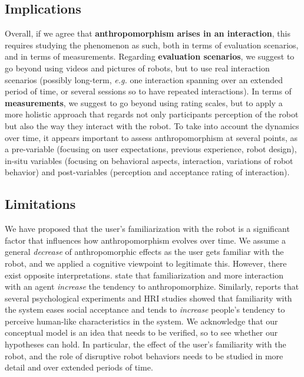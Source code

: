 \documentclass{frontiersSCNS} %
\newcommand{\eg}{\textit{e.g.}\xspace}
\begin{document}
\subsection{Implications}

Overall, if we agree that \textbf{anthropomorphism arises in an interaction},
this requires studying the phenomenon as such, both in terms of evaluation
scenarios, and in terms of measurements. Regarding \textbf{evaluation
scenarios}, we suggest to go beyond using videos and pictures of robots, but to
use real interaction scenarios (possibly long-term, \eg one interaction spanning
over an extended period of time, or several sessions so to have repeated
interactions). In terms of \textbf{measurements}, we suggest to go beyond using
rating scales, but to apply a more holistic approach that regards not only
participants perception of the robot but also the way they interact with the
robot. To take into account the dynamics over time, it appears important to
assess anthropomorphism at several points, as a
pre-variable (focusing on user expectations, previous experience, robot design),
in-situ variables (focusing on behavioral aspects, interaction, variations of
robot behavior) and post-variables (perception and acceptance rating of
interaction).

\subsection{Limitations}

We have proposed that the user's familiarization with the robot is a significant
factor that influences how anthropomorphism evolves over time. We assume a
general \textit{decrease} of anthropomorphic effects as the user gets familiar
with the robot, and we applied a cognitive viewpoint to legitimate this.
However, there exist opposite interpretations. \cite{eddy_attribution_1993}
state that familiarization and more interaction with an agent \textit{increase}
the tendency to anthropomorphize. Similarly, \cite{duffy_anthropomorphism_2003}
reports that several psychological experiments and HRI studies showed that
familiarity with the system eases social acceptance and tends to
\textit{increase} people's tendency to perceive human-like characteristics in
the system.  We acknowledge that our conceptual model is an idea that needs to
be verified, so to see whether our hypotheses can hold. In particular, the
effect of the user's familiarity with the robot, and the role of disruptive
robot behaviors needs to be studied in more detail and over extended periods of
time.
\end{document}
